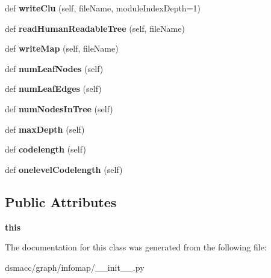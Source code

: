 \begin{DoxyCompactItemize}
def {\bfseries write\+Clu} (self, file\+Name, module\+Index\+Depth=1)
\item 
\mbox{\label{classdsmacc_1_1graph_1_1infomap_1_1HierarchicalNetwork_a8a0dfb3aa6d9b01645e8f879707ed51a}} 
def {\bfseries read\+Human\+Readable\+Tree} (self, file\+Name)
\item 
\mbox{\label{classdsmacc_1_1graph_1_1infomap_1_1HierarchicalNetwork_a750a9190cce6384835d2807acae19b0c}} 
def {\bfseries write\+Map} (self, file\+Name)
\item 
\mbox{\label{classdsmacc_1_1graph_1_1infomap_1_1HierarchicalNetwork_a18a04e54fd21c0fe448d6fa814480ec6}} 
def {\bfseries num\+Leaf\+Nodes} (self)
\item 
\mbox{\label{classdsmacc_1_1graph_1_1infomap_1_1HierarchicalNetwork_aec814b14af65b520665f4ff9ea4e6a7b}} 
def {\bfseries num\+Leaf\+Edges} (self)
\item 
\mbox{\label{classdsmacc_1_1graph_1_1infomap_1_1HierarchicalNetwork_a86756bb6241abe186d476e3c57ed9e6b}} 
def {\bfseries num\+Nodes\+In\+Tree} (self)
\item 
\mbox{\label{classdsmacc_1_1graph_1_1infomap_1_1HierarchicalNetwork_a182bae87afa32558cbaf233461599bb0}} 
def {\bfseries max\+Depth} (self)
\item 
\mbox{\label{classdsmacc_1_1graph_1_1infomap_1_1HierarchicalNetwork_a8487fd75ff4f666612e13b6f60d5459e}} 
def {\bfseries codelength} (self)
\item 
\mbox{\label{classdsmacc_1_1graph_1_1infomap_1_1HierarchicalNetwork_a9ff6338404fb5476899686de7740a462}} 
def {\bfseries onelevel\+Codelength} (self)
\end{DoxyCompactItemize}
\subsection*{Public Attributes}
\begin{DoxyCompactItemize}
\item 
\mbox{\label{classdsmacc_1_1graph_1_1infomap_1_1HierarchicalNetwork_a2bdf4868cde2288c77fb534bf57c2a24}} 
{\bfseries this}
\end{DoxyCompactItemize}


The documentation for this class was generated from the following file\+:\begin{DoxyCompactItemize}
\item 
dsmacc/graph/infomap/\+\_\+\+\_\+init\+\_\+\+\_\+.\+py\end{DoxyCompactItemize}
